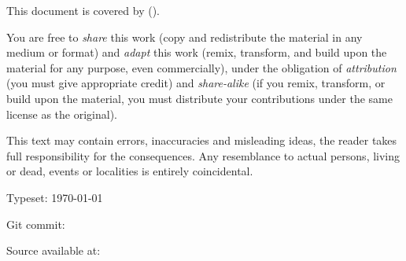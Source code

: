 
{\small
\setlength{\parindent}{0em}
\setlength{\parskip}{1em}

\vspace*{\fill}

\doclicenseIcon%
This document is covered by
\doclicenseLongNameRef{} (\doclicenseNameRef).

You are free to
\emph{share} this work (copy and redistribute the material in any medium or format)
and
\emph{adapt} this work (remix, transform, and build upon the material for any purpose, even commercially),
under the obligation of
\emph{attribution} (you must give appropriate credit)
and
\emph{share-alike} (if you remix, transform, or build upon the material, you must distribute your contributions under the same license as the original).

This text may contain errors, inaccuracies and misleading ideas, the reader takes full responsibility for the consequences.
Any resemblance to actual persons, living or dead, events or localities is entirely coincidental.

Typeset: \today

Git commit: \commiturl%

Source available at: \sourcelink%
}
